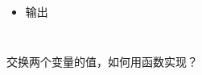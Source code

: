 \begin{frame}[fragile]
{\begin{columns}[onlytextwidth,T]
            \begin{itemize}
                \item<7> 输出\\
            \end{itemize}

        \end{columns}
    }{
        \begin{block}{}
            \vspace{.5cm}
            \begin{center}   
                交换两个变量的值，如何用函数实现？
            \end{center}
            \vspace{.5cm}
        \end{block}
    }
\end{frame}

